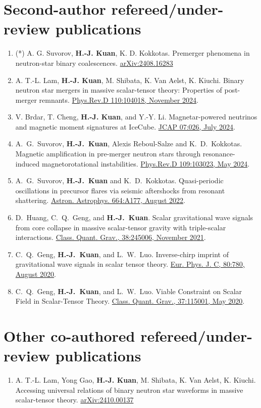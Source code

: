 \documentclass[10pt,floatfix,a4paper]{article}
\begin{document}
\section*{Second-author refereed/under-review publications}
\begin{enumerate}
	\item (*) A. G. Suvorov, \textbf{H.-J. Kuan}, K. D. Kokkotas. Premerger phenomena in neutron-star binary coalescences. \href{https://arxiv.org/abs/2408.16283}{arXiv:2408.16283 }
	\item A. T.-L. Lam, \textbf{H.-J. Kuan}, M. Shibata, K. Van Aelst, K. Kiuchi. Binary neutron star mergers in massive scalar-tensor theory: Properties of post-merger remnants. \href{https://journals.aps.org/prd/abstract/10.1103/PhysRevD.110.104018}{Phys.Rev.D 110:104018, November 2024}.
	\item V. Brdar, T. Cheng, \textbf{H.-J. Kuan}, and Y.-Y. Li. Magnetar-powered neutrinos and magnetic moment signatures at IceCube. \href{https://iopscience.iop.org/article/10.1088/1475-7516/2024/07/026}{JCAP 07:026, July 2024}. 
	\item A.~G.~Suvorov, \textbf{H.-J.~Kuan}, Alexis Reboul-Salze and K.~D.~Kokkotas. Magnetic amplification in pre-merger neutron stars through resonance-induced magnetorotational instabilities.  \href{https://journals.aps.org/prd/abstract/10.1103/PhysRevD.109.103023}{Phys.Rev.D 109:103023, May 2024}.
	\item A.~G.~Suvorov, \textbf{H.-J.~Kuan} and K.~D.~Kokkotas. Quasi-periodic oscillations in precursor flares via seismic aftershocks from resonant shattering. \href{https://www.aanda.org/articles/aa/full_html/2022/08/aa44082-22/aa44082-22.html}{Astron. Astrophys. 664:A177, August 2022}.
	\item D.~Huang, C.~Q.~Geng, and \textbf{H.-J.~Kuan}. Scalar gravitational wave signals from core collapse in massive scalar-tensor gravity with triple-scalar interactions. \href{https://doi.org/10.1088/1361-6382/ac35ab}{Class. Quant. Grav., 38:245006, November 2021}.
	\item C.~Q.~Geng, \textbf{H.-J.~Kuan}, and L.~W.~Luo. Inverse-chirp imprint of gravitational wave signals in scalar tensor theory. \href{https://doi.org/10.1140/epjc/s10052-020-8359-y}{Eur. Phys. J. C, 80:780, August 2020}.
	\item C.~Q.~Geng, \textbf{H.-J.~Kuan}, and L.~W.~Luo. Viable Constraint on Scalar Field in Scalar-Tensor Theory.	\href{https://doi.org/10.1088/1361-6382/ab86fb}{Class. Quant. Grav., 37:115001, May 2020}.
\end{enumerate}



\section*{Other co-authored refereed/under-review publications}
\begin{enumerate}
	\item A. T.-L. Lam, Yong Gao, \textbf{H.-J. Kuan}, M. Shibata, K. Van Aelst, K. Kiuchi. Accessing universal relations of binary neutron star waveforms in massive scalar-tensor theory. \href{https://arxiv.org/abs/2410.00137 }{arXiv:2410.00137 }
\end{enumerate}
\end{document}

